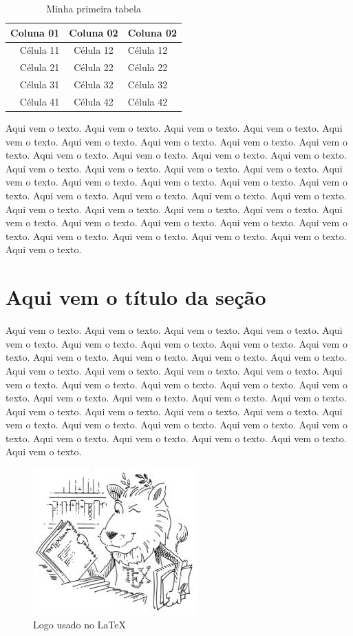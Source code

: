 \documentclass[12pt,a4paper]{article}
\begin{document}
	\begin{table}[htb]
		\centering
		\begin{tabular}{|r|c|l|}
			\hline
			Coluna 01 & Coluna 02 & Coluna 02 \\ \hline
			Célula 11 & Célula 12 & Célula 12 \\
			Célula 21 & Célula 22 & Célula 22 \\
			Célula 31 & Célula 32 & Célula 32 \\
			Célula 41 & Célula 42 & Célula 42 \\ \hline
		\end{tabular}
		\caption{Minha primeira tabela}
		\label{minha_tabela1}
	\end{table}
	
	Aqui vem o texto. Aqui vem o texto. Aqui vem o texto. Aqui vem o texto. Aqui vem o texto. Aqui vem o texto. Aqui vem o texto. Aqui vem o texto. Aqui vem o texto. Aqui vem o texto. Aqui vem o texto. Aqui vem o texto. Aqui vem o texto. Aqui vem o texto. Aqui vem o texto. Aqui vem o texto. Aqui vem o texto. Aqui vem o texto. Aqui vem o texto. Aqui vem o texto. Aqui vem o texto. Aqui vem o texto. Aqui vem o texto. Aqui vem o texto. Aqui vem o texto. Aqui vem o texto. Aqui vem o texto. Aqui vem o texto. Aqui vem o texto. Aqui vem o texto. Aqui vem o texto. Aqui vem o texto. Aqui vem o texto. Aqui vem o texto. Aqui vem o texto. Aqui vem o texto. Aqui vem o texto. Aqui vem o texto. Aqui vem o texto. Aqui vem o texto.
	
	\section{Aqui vem o título da seção}
	
	Aqui vem o texto. Aqui vem o texto. Aqui vem o texto. Aqui vem o texto. Aqui vem o texto. Aqui vem o texto. Aqui vem o texto. Aqui vem o texto. Aqui vem o texto. Aqui vem o texto. Aqui vem o texto. Aqui vem o texto. Aqui vem o texto. Aqui vem o texto. Aqui vem o texto. Aqui vem o texto. Aqui vem o texto. Aqui vem o texto. Aqui vem o texto. Aqui vem o texto. Aqui vem o texto. Aqui vem o texto. Aqui vem o texto. Aqui vem o texto. Aqui vem o texto. Aqui vem o texto. Aqui vem o texto. Aqui vem o texto. Aqui vem o texto. Aqui vem o texto. Aqui vem o texto. Aqui vem o texto. Aqui vem o texto. Aqui vem o texto. Aqui vem o texto. Aqui vem o texto. Aqui vem o texto. Aqui vem o texto. Aqui vem o texto. Aqui vem o texto.
	
	\begin{figure}[htb]
		\centering
		\includegraphics[scale=1]{ctan-leao.jpg}
		\caption{Logo usado no \LaTeX}
		\label{ctan_leao}
	\end{figure}
	
\end{document}

